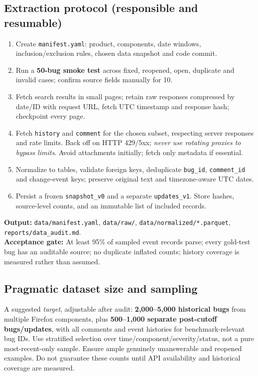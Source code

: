 \documentclass[11pt,a4paper]{article}
\newcommand{\deliver}[1]{\textbf{Output:} #1}
\newcommand{\gate}[1]{\textbf{Acceptance gate:} #1}
\begin{document}
\subsection{Extraction protocol (responsible and resumable)}
\begin{enumerate}
\item Create \texttt{manifest.yaml}: product, components, date windows, inclusion/exclusion rules, chosen data snapshot and code commit.
\item Run a \textbf{50-bug smoke test} across fixed, reopened, open, duplicate and invalid cases; confirm source fields manually for 10.
\item Fetch search results in small pages; retain raw responses compressed by date/ID with request URL, fetch UTC timestamp and response hash; checkpoint every page.
\item Fetch \texttt{history} and \texttt{comment} for the chosen subset, respecting server responses and rate limits. Back off on HTTP 429/5xx; \emph{never use rotating proxies to bypass limits}. Avoid attachments initially; fetch only metadata if essential.
\item Normalize to tables, validate foreign keys, deduplicate \texttt{bug\_id}, \texttt{comment\_id} and change-event keys; preserve original text and timezone-aware UTC dates.
\item Persist a frozen \texttt{snapshot\_v0} and a separate \texttt{updates\_v1}. Store hashes, source-level counts, and an immutable list of included records.
\end{enumerate}
\deliver{\texttt{data/manifest.yaml}, \texttt{data/raw/}, \texttt{data/normalized/*.parquet}, \texttt{reports/data\_audit.md}.}\\
\gate{At least 95\% of sampled event records parse; every gold-test bug has an auditable source; no duplicate inflated counts; history coverage is measured rather than assumed.}

\subsection{Pragmatic dataset size and sampling}
A suggested \emph{target}, adjustable after audit: \textbf{2,000--5,000 historical bugs} from multiple Firefox components, plus \textbf{500--1,000 separate post-cutoff bugs/updates}, with all comments and event histories for benchmark-relevant bug IDs. Use stratified selection over time/component/severity/status, not a pure most-recent-only sample. Ensure ample genuinely unanswerable and reopened examples. Do not guarantee these counts until API availability and historical coverage are measured.
\end{document}
